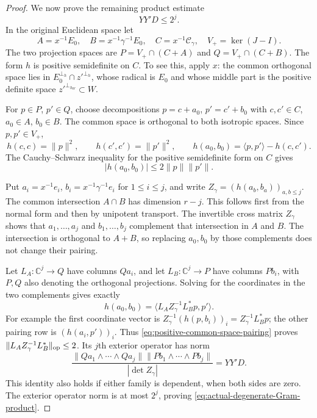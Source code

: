 \begin{proof}
We now prove the remaining product estimate
\begin{equation}\label{eq:actual-degenerate-Gram-product}
                                  YY'D\le2^j.
\end{equation}
In the original Euclidean space let
\[
 A=x^{-1}E_0,\quad B=x^{-1}\gamma^{-1}E_0,\quad
 C=x^{-1}\mathcal C_\gamma,\quad V_+=\ker(J-I).
\]
The two projection spaces are
$P=V_+\cap(C+A)$ and $Q=V_+\cap(C+B)$.
The form $h$ is positive semidefinite on $C$.
To see this, apply $x$: the common orthogonal space lies in
$E_0^{\perp_h}\cap z'^{\perp_h}$, whose radical is $E_0$
and whose middle part is the positive definite space
$z'^{\perp_{h_W}}\subset W$.

For $p\in P$, $p'\in Q$, choose decompositions
$p=c+a_0$, $p'=c'+b_0$ with $c,c'\in C$, $a_0\in A$,
$b_0\in B$.  The common space is orthogonal to both
isotropic spaces.  Since $p,p'\in V_+$,
\[
 h(c,c)=\|p\|^2,\qquad h(c',c')=\|p'\|^2,\qquad
 h(a_0,b_0)=\langle p,p'\rangle-h(c,c').
\]
The Cauchy--Schwarz inequality for the positive semidefinite
form on $C$ gives
\begin{equation}\label{eq:positive-common-space-pairing}
                         |h(a_0,b_0)|\le2\|p\|\|p'\|.
\end{equation}

Put $a_i=x^{-1}e_i$, $b_i=x^{-1}\gamma^{-1}e_i$ for
$1\le i\le j$, and write $Z_\gamma=(h(a_b,b_a))_{a,b\le j}$.
The common intersection $A\cap B$ has dimension $r-j$.
This follows first from the normal form and then by unipotent
transport.  The invertible cross matrix $Z_\gamma$ shows that
$a_1,\ldots,a_j$ and $b_1,\ldots,b_j$ complement that
intersection in $A$ and $B$.  The intersection is orthogonal
to $A+B$, so replacing $a_0,b_0$ by those complements does
not change their pairing.

Let $L_A:\mathbb C^j\to Q$ have columns $Q a_i$, and let
$L_B:\mathbb C^j\to P$ have columns $P b_i$, with $P,Q$
also denoting the orthogonal projections.  Solving for the
coordinates in the two complements gives exactly
\[
                  h(a_0,b_0)
                        =\langle L_A Z_\gamma^{-1}L_B^*p,p'\rangle.
\]
For example the first coordinate vector is
$Z_\gamma^{-1}(h(p,b_i))_i=Z_\gamma^{-1}L_B^*p$; the other
pairing row is $(h(a_i,p'))_i$.  Thus
\eqref{eq:positive-common-space-pairing} proves
$\|L_A Z_\gamma^{-1}L_B^*\|_{\rm op}\le2$.
Its $j$th exterior operator has norm
\[
 \frac{\|Qa_1\wedge\cdots\wedge Qa_j\|
          \|Pb_1\wedge\cdots\wedge Pb_j\|}{|\det Z_\gamma|}
                      =YY'D.
\]
This identity also holds if either family is dependent, when
both sides are zero.  The exterior operator norm is at most
$2^j$, proving \eqref{eq:actual-degenerate-Gram-product}.


\end{proof}
